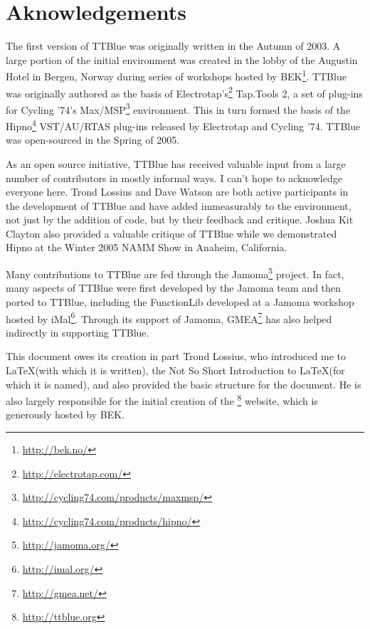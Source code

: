 \chapter*{Aknowledgements}

The first version of TTBlue was originally written in the Autumn of 2003.  A large portion of the initial environment was created in the lobby of the Augustin Hotel in Bergen, Norway during series of workshops hosted by BEK\footnote{\url{http://bek.no/}}.  TTBlue was originally authored as the basis of Electrotap’s\footnote{\url{http://electrotap.com/}} Tap.Tools 2, a set of plug-ins for Cycling ’74’s Max/MSP\footnote{\url{http://cycling74.com/products/maxmsp/}} environment.  This in turn formed the basis of the Hipno\footnote{\url{http://cycling74.com/products/hipno/}} VST/AU/RTAS plug-ins released by Electrotap and Cycling ’74.  TTBlue was open-sourced in the Spring of 2005.

As an open source initiative, TTBlue has received valuable input from a large number of contributors in mostly informal ways.  
I can't hope to acknowledge everyone here.  Trond Lossius and Dave Watson are both active participants in the development of TTBlue and have added immeasurably to the environment, not just by the addition of code, but by their feedback and critique.  Joshua Kit Clayton also provided a valuable critique of TTBlue while we demonstrated Hipno at the Winter 2005 NAMM Show in Anaheim, California.

Many contributions to TTBlue are fed through the Jamoma\footnote{\url{http://jamoma.org/}} project.  In fact, many aspects of TTBlue were first developed by the Jamoma team and then ported to TTBlue, including the FunctionLib developed at a Jamoma workshop hosted by iMal\footnote{\url{http://imal.org/}}.  Through its support of Jamoma, GMEA\footnote{\url{http://gmea.net/}} has also helped indirectly in supporting TTBlue.

This document owes its creation in part Trond Lossius, who introduced me to \LaTeX (with which it is written), the Not So Short Introduction to \LaTeX (for which it is named), and also provided the basic structure for the document.  He is also largely responsible for the initial creation of the \footnote{\url{http://ttblue.org}} website, which is generously hosted by BEK.

